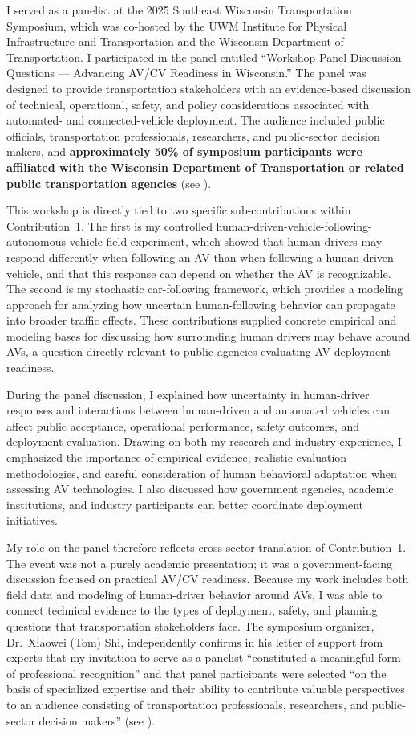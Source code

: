 \documentclass[11pt,letterpaper]{article}
\begin{document}
I served as a panelist at the 2025 Southeast Wisconsin Transportation Symposium, which was co-hosted by the UWM Institute for Physical Infrastructure and Transportation and the Wisconsin Department of Transportation. I participated in the panel entitled ``Workshop Panel Discussion Questions --- Advancing AV/CV Readiness in Wisconsin.'' The panel was designed to provide transportation stakeholders with an evidence-based discussion of technical, operational, safety, and policy considerations associated with automated- and connected-vehicle deployment. The audience included public officials, transportation professionals, researchers, and public-sector decision makers, and \textbf{approximately 50\% of symposium participants were affiliated with the Wisconsin Department of Transportation or related public transportation agencies} (see ).

This workshop is directly tied to two specific sub-contributions within Contribution~1. The first is my controlled human-driven-vehicle-following-autonomous-vehicle field experiment, which showed that human drivers may respond differently when following an AV than when following a human-driven vehicle, and that this response can depend on whether the AV is recognizable. The second is my stochastic car-following framework, which provides a modeling approach for analyzing how uncertain human-following behavior can propagate into broader traffic effects. These contributions supplied concrete empirical and modeling bases for discussing how surrounding human drivers may behave around AVs, a question directly relevant to public agencies evaluating AV deployment readiness.

During the panel discussion, I explained how uncertainty in human-driver responses and interactions between human-driven and automated vehicles can affect public acceptance, operational performance, safety outcomes, and deployment evaluation. Drawing on both my research and industry experience, I emphasized the importance of empirical evidence, realistic evaluation methodologies, and careful consideration of human behavioral adaptation when assessing AV technologies. I also discussed how government agencies, academic institutions, and industry participants can better coordinate deployment initiatives.

My role on the panel therefore reflects cross-sector translation of Contribution~1. The event was not a purely academic presentation; it was a government-facing discussion focused on practical AV/CV readiness. Because my work includes both field data and modeling of human-driver behavior around AVs, I was able to connect technical evidence to the types of deployment, safety, and planning questions that transportation stakeholders face. The symposium organizer, Dr.~Xiaowei (Tom) Shi, independently confirms in his letter of support from experts that my invitation to serve as a panelist ``constituted a meaningful form of professional recognition'' and that panel participants were selected ``on the basis of specialized expertise and their ability to contribute valuable perspectives to an audience consisting of transportation professionals, researchers, and public-sector decision makers'' (see ).
\end{document}

